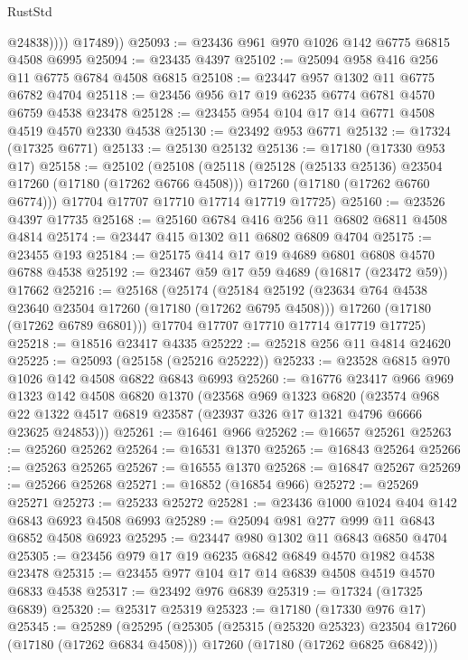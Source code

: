 \begin{lexlean}{RustStd}
\begin{coremodule}
                @24838))))
        @17489))
@25093 := @23436 @961 @970 @1026 @142 @6775 @6815 @4508 @6995
@25094 := @23435 @4397
@25102 := @25094 @958 @416 @256 @11 @6775 @6784 @4508 @6815
@25108 := @23447 @957 @1302 @11 @6775 @6782 @4704
@25118 := @23456 @956 @17 @19 @6235 @6774 @6781 @4570 @6759 @4538 @23478
@25128 := @23455 @954 @104 @17 @14 @6771 @4508 @4519 @4570 @2330 @4538
@25130 := @23492 @953 @6771
@25132 := @17324 (@17325 @6771)
@25133 := @25130 @25132
@25136 := @17180 (@17330 @953 @17)
@25158 := @25102
    (@25108
      (@25118
        (@25128 (@25133 @25136) @23504 @17260 (@17180 (@17262 @6766 @4508)))
        @17260
        (@17180 (@17262 @6760 @6774)))
      @17704
      @17707
      @17710
      @17714
      @17719
      @17725)
@25160 := @23526 @4397 @17735
@25168 := @25160 @6784 @416 @256 @11 @6802 @6811 @4508 @4814
@25174 := @23447 @415 @1302 @11 @6802 @6809 @4704
@25175 := @23455 @193
@25184 := @25175 @414 @17 @19 @4689 @6801 @6808 @4570 @6788 @4538
@25192 := @23467 @59 @17 @59 @4689 (@16817 (@23472 @59)) @17662
@25216 := @25168
    (@25174
      (@25184
        @25192
        (@23634 @764 @4538 @23640 @23504 @17260 (@17180 (@17262 @6795 @4508)))
        @17260
        (@17180 (@17262 @6789 @6801)))
      @17704
      @17707
      @17710
      @17714
      @17719
      @17725)
@25218 := @18516 @23417 @4335
@25222 := @25218 @256 @11 @4814 @24620
@25225 := @25093 (@25158 (@25216 @25222))
@25233 := @23528 @6815 @970 @1026 @142 @4508 @6822 @6843 @6993
@25260 := @16776
    @23417
    @966
    @969
    @1323
    @142
    @4508
    @6820
    @1370
    (@23568
      @969
      @1323
      @6820
      (@23574 @968 @22 @1322 @4517 @6819 @23587 (@23937 @326 @17 @1321 @4796 @6666 @23625 @24853)))
@25261 := @16461 @966
@25262 := @16657 @25261
@25263 := @25260 @25262
@25264 := @16531 @1370
@25265 := @16843 @25264
@25266 := @25263 @25265
@25267 := @16555 @1370
@25268 := @16847 @25267
@25269 := @25266 @25268
@25271 := @16852 (@16854 @966)
@25272 := @25269 @25271
@25273 := @25233 @25272
@25281 := @23436 @1000 @1024 @404 @142 @6843 @6923 @4508 @6993
@25289 := @25094 @981 @277 @999 @11 @6843 @6852 @4508 @6923
@25295 := @23447 @980 @1302 @11 @6843 @6850 @4704
@25305 := @23456 @979 @17 @19 @6235 @6842 @6849 @4570 @1982 @4538 @23478
@25315 := @23455 @977 @104 @17 @14 @6839 @4508 @4519 @4570 @6833 @4538
@25317 := @23492 @976 @6839
@25319 := @17324 (@17325 @6839)
@25320 := @25317 @25319
@25323 := @17180 (@17330 @976 @17)
@25345 := @25289
    (@25295
      (@25305
        (@25315 (@25320 @25323) @23504 @17260 (@17180 (@17262 @6834 @4508)))
        @17260
        (@17180 (@17262 @6825 @6842)))

\end{coremodule}
\end{lexlean}
